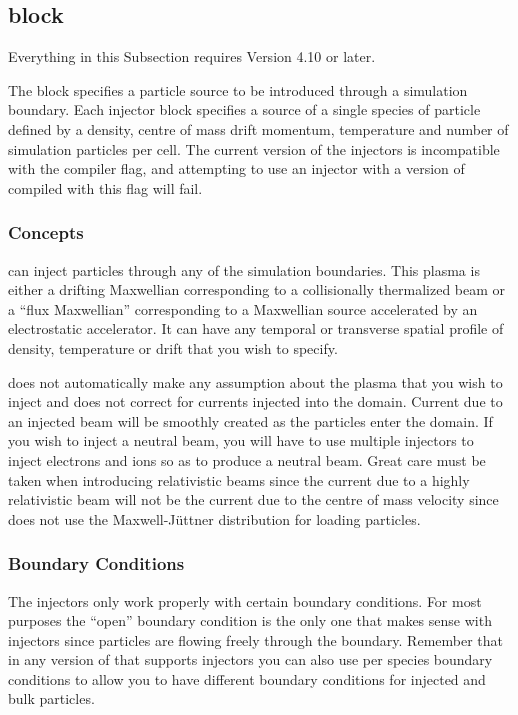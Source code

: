 \subsection{\texorpdfstring
  { block}
  {           {injector} block}}
\label{sec:injector_block}

{\emphtext
Everything in this Subsection requires {\EPOCH} Version 4.10 or later.}

The  block specifies a particle source to be introduced
through a simulation boundary. Each injector block specifies a source of a
single species of particle defined by a density, centre of mass drift momentum,
temperature and number of simulation particles per cell. The current version
of the injectors is incompatible with the 
compiler flag, and attempting to use an injector with a version of {\EPOCH}
compiled with this flag will fail.

\subsubsection{Concepts}

{\EPOCH} can inject particles through any of the simulation boundaries. This
plasma is either a drifting Maxwellian corresponding to a collisionally
thermalized beam or a ``flux Maxwellian'' corresponding to a Maxwellian source
accelerated by an electrostatic accelerator. It can have any temporal or
transverse spatial profile of density, temperature or drift that you wish to
specify.

{\EPOCH} does not automatically make any assumption about the plasma that you
wish to inject and does not correct for currents injected into the domain.
Current due to an injected beam will be smoothly created as the particles enter
the domain. If you wish to inject a neutral beam, you will have to use multiple
injectors to inject electrons and ions so as to produce a neutral beam. Great
care must be taken when introducing relativistic beams since the current due
to a highly relativistic beam will not be the current due to the centre of mass
velocity since {\EPOCH} does not use the Maxwell-J\"{u}ttner distribution for
loading particles.

\subsubsection{Boundary Conditions}

The injectors only work properly with certain boundary conditions. For most
purposes the ``open'' boundary condition is the only one that makes sense with
injectors since particles are flowing freely through the boundary. Remember
that in any version of {\EPOCH} that supports injectors you can also use per
species boundary conditions to allow you to have different boundary conditions
for injected and bulk particles.

